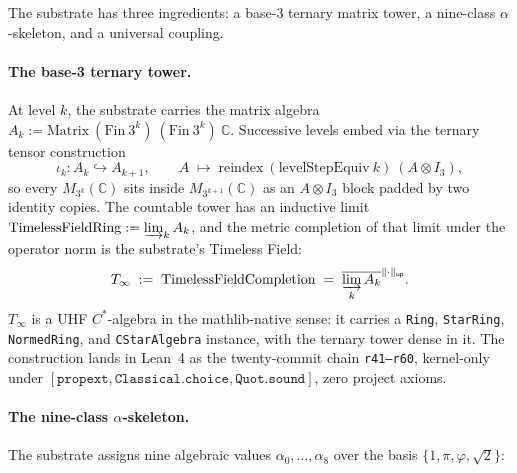 \documentclass[11pt,a4paper]{amsart}
\theoremstyle{plain}
\theoremstyle{definition}
\begin{document}
The substrate has three ingredients: a base-3 ternary matrix tower, a nine-class $\alpha$-skeleton, and a universal coupling.

\paragraph{The base-3 ternary tower.} At level $k$, the substrate carries the matrix algebra $A_k := \mathrm{Matrix}~(\mathrm{Fin}~3^k)~(\mathrm{Fin}~3^k)~\mathbb{C}$. Successive levels embed via the ternary tensor construction
\[
\iota_k \colon A_k \hookrightarrow A_{k+1}, \qquad A \;\longmapsto\; \mathrm{reindex}~(\mathrm{levelStepEquiv}~k)~(A \otimes I_3),
\]
so every $M_{3^k}(\mathbb{C})$ sits inside $M_{3^{k+1}}(\mathbb{C})$ as an $A \otimes I_3$ block padded by two identity copies. The countable tower has an inductive limit $\mathrm{TimelessFieldRing} := \varinjlim_k A_k$, and the metric completion of that limit under the operator norm is the substrate's Timeless Field:
\[
T_\infty \;:=\; \mathrm{TimelessFieldCompletion} \;=\; \overline{\varinjlim_k A_k}^{\|\cdot\|_{\textsf{op}}}.
\]
$T_\infty$ is a UHF $C^*$-algebra in the mathlib-native sense: it carries a \texttt{Ring}, \texttt{StarRing}, \texttt{NormedRing}, and \texttt{CStarAlgebra} instance, with the ternary tower dense in it. The construction lands in Lean~4 as the twenty-commit chain \texttt{r41--r60}, kernel-only under $[\texttt{propext}, \texttt{Classical.choice}, \texttt{Quot.sound}]$, zero project axioms.

\paragraph{The nine-class $\alpha$-skeleton.} The substrate assigns nine algebraic values $\alpha_0, \dots, \alpha_8$ over the basis $\{1, \pi, \varphi, \sqrt{2}\}$:
\end{document}
